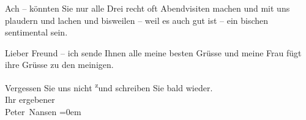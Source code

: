 \pstart
           Ach – könnten Sie nur alle Drei recht oft \strikeout{\textcolor{gray}{ein}} Abendvisiten machen und mit uns plaudern und lachen und bisweilen – weil es
               auch gut ist – ein bischen sentimental sein.\pend
           
\pstart
           Lieber Freund – ich sende Ihnen alle meine besten Grüsse und meine Frau fügt ihre Grüsse zu den meinigen.\pend
           
\pstart
           Vergessen Sie uns nicht \substVorne{}\textsuperscript{z}\substDazwischen{}u\substHinten{}nd schreiben Sie bald wieder.{\\[\baselineskip]} Ihr ergebener{\\[\baselineskip]}\spacefill\mbox{Peter Nansen}\pend
           \leftskip=0em{}\endnumbering{}  \newcommand{\dateiname}{L02786}\newcommand{\titel}{Paul Goldmann an Arthur Schnitzler, 26. 9. [1896]}\newcommand{\editorInnen}{Martin Anton Müller und Laura Untner}
